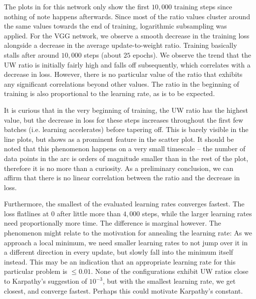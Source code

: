 The plots in for this network only show the first $10,000$ training steps since
nothing of note happens afterwards. Since most of the ratio values cluster
around the same values towards the end of training, logarithmic subsampling was
applied.  For the VGG network, we observe a smooth decrease in the training loss
alongside a decrease in the average update-to-weight ratio. Training basically
stalls after around $10,000$ steps (about $25$ epochs).  We observe the trend
that the UW ratio is initially fairly high and falls off subsequently, which
correlates with a decrease in loss. However, there is no particular value of the
ratio that exhibits any significant correlations beyond other values. The
ratio in the beginning of training is also proportional to the learning rate, as
is to be expected.

It is curious that in the very beginning of training, the UW ratio has the
highest value, but the decrease in loss for these steps increases throughout the
first few batches (i.e. learning accelerates) before tapering off. This is
barely visible in the line plots, but shows as a prominent feature in the
scatter plot. It should be noted that this phenomenon happens on a very small
timescale -- the number of data points in the arc is orders of magnitude smaller
than in the rest of the plot, therefore it is no more than a curiosity. As a
preliminary conclusion, we can affirm that there is no linear correlation
between the ratio and the decrease in loss.

Furthermore, the smallest of the evaluated learning rates converges fastest.
The loss flatlines at $0$ after little more than $4,000$ steps, while the larger
learning rates need proportionally more time. The difference is marginal
however. The phenomenon might relate to the motivation for annealing the
learning rate: As we approach a local minimum, we need smaller learning rates to
not jump over it in a different direction in every update, but slowly fall into
the minimum itself instead. This may be an indication that an appropriate learning rate
for this particular problem is $\le 0.01$. None of the configurations exhibit UW
ratios close to Karpathy's suggestion of $10^{-3}$, but with the smallest
learning rate, we get closest, and converge fastest. Perhaps this could motivate
Karpathy's constant.


